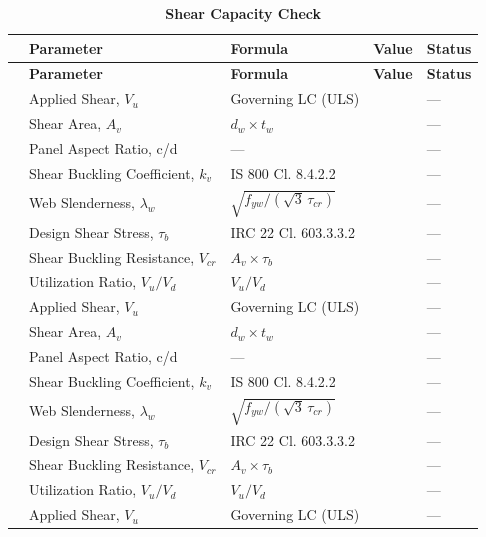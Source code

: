 \documentclass[12pt,a4paper]{report}
\numberwithin{table}{chapter}
\numberwithin{figure}{chapter}
\begin{document}
\vspace{1em}
\begin{longtable}{|C{2.5cm}|C{3.5cm}|C{3.5cm}|>{\centering\arraybackslash}p{4.2cm}|C{1.8cm}|}
\caption{\textbf{Shear Capacity Check}}
\hline
{} \textbf{} & \textbf{Parameter} & \textbf{Formula} & \textbf{Value} & \textbf{Status} \\[6pt]
\hline
\endfirsthead
\hline
{} \textbf{} & \textbf{Parameter} & \textbf{Formula} & \textbf{Value} & \textbf{Status} \\[6pt]
\hline
\endhead
{} & Applied Shear, $V_u$ & Governing LC (ULS) &  & --- \\[6pt]
 & Shear Area, $A_v$ & $d_w \times t_w$ &  & --- \\[6pt]
 & Panel Aspect Ratio, c/d & --- &  & --- \\[6pt]
 & Shear Buckling Coefficient, $k_v$ & IS 800 Cl. 8.4.2.2 &  & --- \\[6pt]
 & Web Slenderness, $\lambda_w$ & $\sqrt{f_{yw}/(\sqrt{3}\,\tau_{cr})}$ &  & --- \\[6pt]
 & Design Shear Stress, $\tau_b$ & IRC 22 Cl. 603.3.3.2 &  & --- \\[6pt]
 & Shear Buckling Resistance, $V_{cr}$ & $A_v \times \tau_b$ &  & --- \\[6pt]
 & Utilization Ratio, $V_u / V_d$ & $V_u / V_d$ &  & --- \\[6pt]
\hline
{} & Applied Shear, $V_u$ & Governing LC (ULS) &  & --- \\[6pt]
 & Shear Area, $A_v$ & $d_w \times t_w$ &  & --- \\[6pt]
 & Panel Aspect Ratio, c/d & --- &  & --- \\[6pt]
 & Shear Buckling Coefficient, $k_v$ & IS 800 Cl. 8.4.2.2 &  & --- \\[6pt]
 & Web Slenderness, $\lambda_w$ & $\sqrt{f_{yw}/(\sqrt{3}\,\tau_{cr})}$ &  & --- \\[6pt]
 & Design Shear Stress, $\tau_b$ & IRC 22 Cl. 603.3.3.2 &  & --- \\[6pt]
 & Shear Buckling Resistance, $V_{cr}$ & $A_v \times \tau_b$ &  & --- \\[6pt]
 & Utilization Ratio, $V_u / V_d$ & $V_u / V_d$ &  & --- \\[6pt]
\hline
{} & Applied Shear, $V_u$ & Governing LC (ULS) &  & --- \\[6pt]

\end{longtable}
\end{document}
